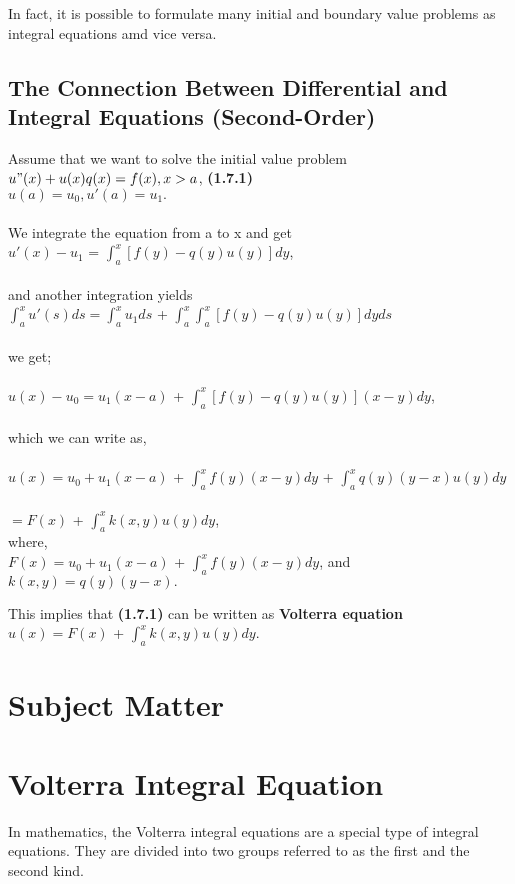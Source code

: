 \documentclass[12pt]{article}
\begin{document}
In fact, it is possible to formulate many initial and boundary value problems as integral equations amd vice versa.

\subsection{The Connection Between Differential and Integral Equations (Second-Order)}
Assume that we want to solve the initial value problem\\
$u"(x) + u(x)q(x) = f(x), x>a$,		\textbf{(1.7.1)}\\
$u(a) = u_0,		u'(a) = u_1.$\\
\\
We integrate the equation from a to x and get\\
$u'(x) - u_1$ = \(\int_{a}^{x} [f(y) - q(y)u(y)]dy\),\\
\\
and another integration yields\\
\(\int_{a}^{x} u'(s)ds = \int_{a}^{x} u_1ds\) + \(\int_{a}^{x}\)\(\int_{a}^{x} [f(y) - q(y)u(y)]dyds\)\\
\\
we get;\\
\\
$u(x) - u_0 = u_1(x-a)$ + \(\int_{a}^{x} [f(y) - q(y)u(y)](x - y)dy\),\\
\\
which we can write as,\\
\\
$u(x) = u_0 + u_1(x-a)$ + \(\int_{a}^{x} f(y)(x - y)dy\) + \(\int_{a}^{x} q(y)(y - x)u(y)dy\)\\
\\
$= F(x)$ + \(\int_{a}^{x} k(x,y)u(y)dy\),\\
where,\\
$F(x) = u_0 + u_1(x - a)$ + \(\int_{a}^{x} f(y)(x - y)dy\), and\\
$k(x,y) = q(y)(y - x).$\\
\par This implies that \textbf{(1.7.1)} can be written as \textbf{Volterra equation}\\
$u(x) = F(x)$ + \(\int_{a}^{x} k(x,y)u(y)dy\).\\
\newpage
\section{Subject Matter}
\section{Volterra Integral Equation}
In mathematics, the Volterra integral equations are a special type of integral equations. They are divided into two groups referred to as the first and the second kind.
\end{document}
